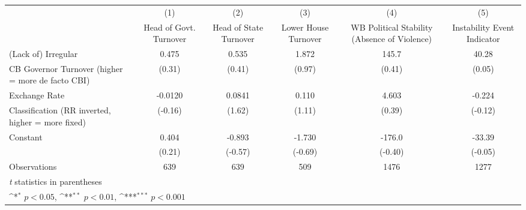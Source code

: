 {
\def\sym#1{\ifmmode^{#1}\else\(^{#1}\)\fi}
\begin{tabular}{l*{5}{c}}
\hline\hline
                    &\multicolumn{1}{c}{(1)}&\multicolumn{1}{c}{(2)}&\multicolumn{1}{c}{(3)}&\multicolumn{1}{c}{(4)}&\multicolumn{1}{c}{(5)}\\
                    &\multicolumn{1}{c}{Head of Govt. Turnover}&\multicolumn{1}{c}{Head of State Turnover}&\multicolumn{1}{c}{Lower House Turnover}&\multicolumn{1}{c}{WB Political Stability (Absence of Violence)}&\multicolumn{1}{c}{Instability Event Indicator}\\
\hline
(Lack of) Irregular &       0.475         &       0.535         &       1.872         &       145.7         &       40.28         \\
CB Governor Turnover (higher = more de facto CBI)&      (0.31)         &      (0.41)         &      (0.97)         &      (0.41)         &      (0.05)         \\
[1em]
Exchange Rate       &     -0.0120         &      0.0841         &       0.110         &       4.603         &      -0.224         \\
Classification (RR inverted, higher = more fixed)&     (-0.16)         &      (1.62)         &      (1.11)         &      (0.39)         &     (-0.12)         \\
[1em]
Constant            &       0.404         &      -0.893         &      -1.730         &      -176.0         &      -33.39         \\
                    &      (0.21)         &     (-0.57)         &     (-0.69)         &     (-0.40)         &     (-0.05)         \\
\hline
Observations        &         639         &         639         &         509         &        1476         &        1277         \\
\hline\hline
\multicolumn{6}{l}{\footnotesize \textit{t} statistics in parentheses}\\
\multicolumn{6}{l}{\footnotesize \sym{*} \(p<0.05\), \sym{**} \(p<0.01\), \sym{***} \(p<0.001\)}\\
\end{tabular}
}
